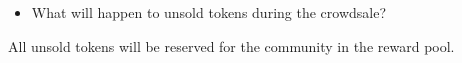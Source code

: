 \documentclass[twoside,onecolumn]{article}
\begin{document}
\begin{itemize}
\item What will happen to unsold tokens during the crowdsale?
\end{itemize}
All unsold tokens will be reserved for the community in the reward pool. 






\end{document}
